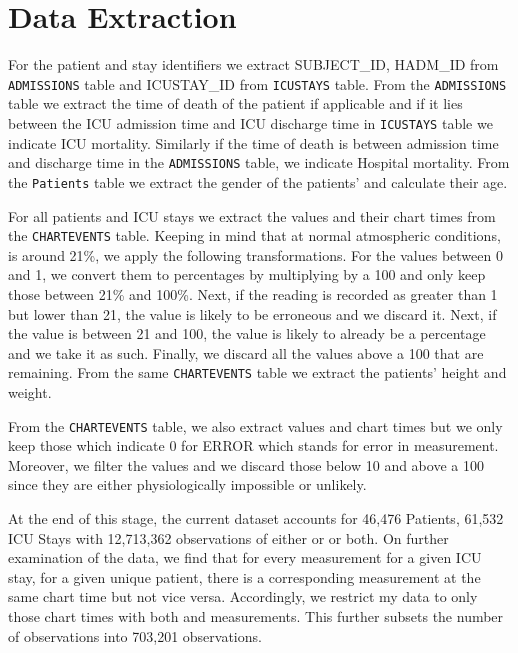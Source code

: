 
\chapter{Data Extraction} %

\label{AppendixA} %


For the patient and stay identifiers we extract SUBJECT\_ID, HADM\_ID from \texttt{ADMISSIONS} table and ICUSTAY\_ID from \texttt{ICUSTAYS} table. From the \texttt{ADMISSIONS} table we extract the time of death of the patient if applicable and if it lies between the ICU admission time and ICU discharge time in \texttt{ICUSTAYS} table we indicate ICU mortality. Similarly if the time of death is between admission time and discharge time in the  \texttt{ADMISSIONS} table, we indicate Hospital mortality. From the \texttt{Patients} table we extract the gender of the patients' and calculate their age.   

For all patients and ICU stays we extract the \Fi values and their chart times from the \texttt{CHARTEVENTS} table. Keeping in mind that at normal atmospheric conditions, \Fi is around 21\%, we apply the following transformations. For the values between 0 and 1, we convert them to percentages by multiplying by a 100 and only keep those between 21\% and 100\%. Next, if the reading is recorded as greater than 1 but lower than 21,  the value is likely to be erroneous and we discard it. Next, if the value is between 21 and 100, the value is likely to already be a percentage and we take it as such. Finally, we discard all the values above a 100 that are remaining. From the same \texttt{CHARTEVENTS} table we extract the patients' height and weight. 

From the \texttt{CHARTEVENTS} table, we also extract \Sp values and chart times but we only keep those which indicate 0 for ERROR which stands for error in measurement.  Moreover, we filter the values and we discard those below 10 and above a 100 since they are either physiologically impossible or unlikely. 

At the end of this stage, the current dataset accounts for 46,476 Patients, 61,532 ICU Stays with 12,713,362 observations of either \Sp or \Fi or both. On further examination of the data, we find that for every \Fi measurement for a given ICU stay, for a given unique patient, there is a corresponding \Sp measurement at the same chart time but not vice versa. Accordingly, we restrict my data to only those chart times with both \Sp and \Fi measurements. This further subsets the number of observations into 703,201 observations.
